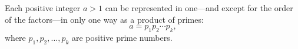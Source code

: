 Each positive integer $a > 1$ can be represented in one---and except for the order of the factors---in only one way as a product of primes:
$$a = p_1 p_2 \cdots p_k,$$
where $p_1, p_2, \ldots, p_k$ are positive prime numbers.
